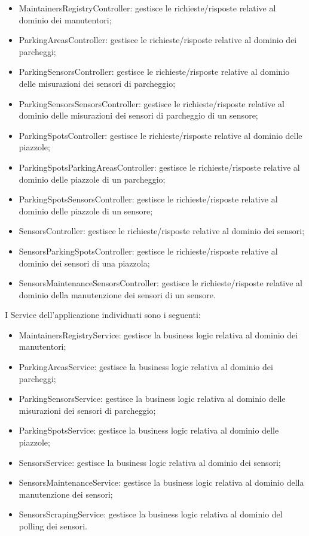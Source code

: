 \begin{itemize}
    \item MaintainersRegistryController: gestisce le richieste/risposte relative al dominio dei manutentori;
    \item ParkingAreasController: gestisce le richieste/risposte relative al dominio dei parcheggi;
    \item ParkingSensorsController: gestisce le richieste/risposte relative al dominio delle misurazioni
    dei sensori di parcheggio;
    \item ParkingSensorsSensorsController: gestisce le richieste/risposte relative al dominio delle misurazioni
    dei sensori di parcheggio di un sensore;
    \item ParkingSpotsController: gestisce le richieste/risposte relative al dominio delle piazzole;
    \item ParkingSpotsParkingAreasController: gestisce le richieste/risposte relative al dominio delle piazzole
    di un parcheggio;
    \item ParkingSpotsSensorsController: gestisce le richieste/risposte relative al dominio delle piazzole
    di un sensore;
    \item SensorsController: gestisce le richieste/risposte relative al dominio dei sensori;
    \item SensorsParkingSpotsController: gestisce le richieste/risposte relative al dominio dei sensori di una
    piazzola;
    \item SensorsMaintenanceSensorsController: gestisce le richieste/risposte relative al dominio della manutenzione dei
    sensori di un sensore.
\end{itemize}
\leavevmode\newline
I Service dell'applicazione individuati sono i seguenti:
\begin{itemize}
    \item MaintainersRegistryService: gestisce la business logic relativa al dominio dei manutentori;
    \item ParkingAreasService: gestisce la business logic relativa al dominio dei parcheggi;
    \item ParkingSensorsService: gestisce la business logic relativa al dominio delle misurazioni dei sensori di parcheggio;
    \item ParkingSpotsService: gestisce la business logic relativa al dominio delle piazzole;
    \item SensorsService: gestisce la business logic relativa al dominio dei sensori;
    \item SensorsMaintenanceService: gestisce la business logic relativa al dominio della manutenzione dei sensori;
    \item SensorsScrapingService: gestisce la business logic relativa al dominio del polling dei sensori.
\end{itemize}
